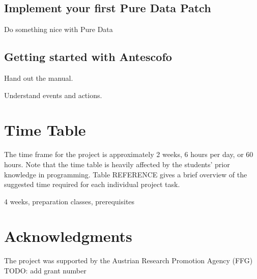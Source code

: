 \documentclass[onecolumn,nocopyrightspace,preprint]{sigplanconf}
\begin{document}
\subsection{Implement your first Pure Data Patch}

Do something nice with Pure Data


\subsection{Getting started with Antescofo}


Hand out the manual.

Understand events and actions.





\section{Time Table}

The time frame for the project is approximately 2 weeks, 6 hours per day, or
60 hours. Note that the time table is heavily affected by the students' prior
knowledge in programming. Table REFERENCE gives a brief overview of the
suggested time required for each individual project task.






4 weeks, preparation classes, prerequisites




\section{Acknowledgments}

The project was supported by the Austrian Research Promotion Agency (FFG) TODO: add grant number


 
\end{document}
